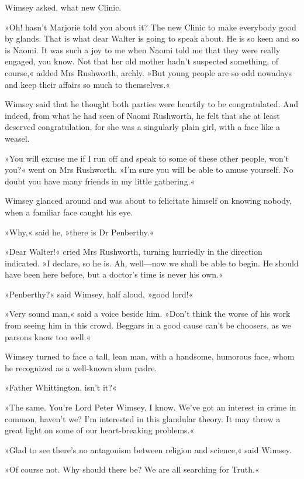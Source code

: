 Wimsey asked, what new Clinic.

»Oh! hasn't Marjorie told you about it? The new Clinic to make everybody good by glands. That is what dear Walter is going to speak about. He is so keen and so is Naomi. It was such a joy to me when Naomi told me that they were really engaged, you know. Not that her old mother hadn't suspected something, of course,« added Mrs Rushworth, archly. »But young people are so odd nowadays and keep their affairs so much to themselves.«

Wimsey said that he thought both parties were heartily to be congratulated. And indeed, from what he had seen of Naomi Rushworth, he felt that she at least deserved congratulation, for she was a singularly plain girl, with a face like a weasel.

»You will excuse me if I run off and speak to some of these other people, won't you?« went on Mrs Rushworth. »I'm sure you will be able to amuse yourself. No doubt you have many friends in my little gathering.«

Wimsey glanced around and was about to felicitate himself on knowing nobody, when a familiar face caught his eye.

»Why,« said he, »there is Dr Penberthy.«

»Dear Walter!« cried Mrs Rushworth, turning hurriedly in the direction indicated. »I declare, so he is. Ah, well\allowbreak---\allowbreak now we shall be able to begin. He should have been here before, but a doctor's time is never his own.«

»Penberthy?« said Wimsey, half aloud, »good lord!«

»Very sound man,« said a voice beside him. »Don't think the worse of his work from seeing him in this crowd. Beggars in a good cause can't be choosers, as we parsons know too well.«

Wimsey turned to face a tall, lean man, with a handsome, humorous face, whom he recognized as a well-known slum padre.

»Father Whittington, isn't it?«

»The same. You're Lord Peter Wimsey, I know. We've got an interest in crime in common, haven't we? I'm interested in this glandular theory. It may throw a great light on some of our heart-breaking problems.«

»Glad to see there's no antagonism between religion and science,« said Wimsey.

»Of course not. Why should there be? We are all searching for Truth.«

